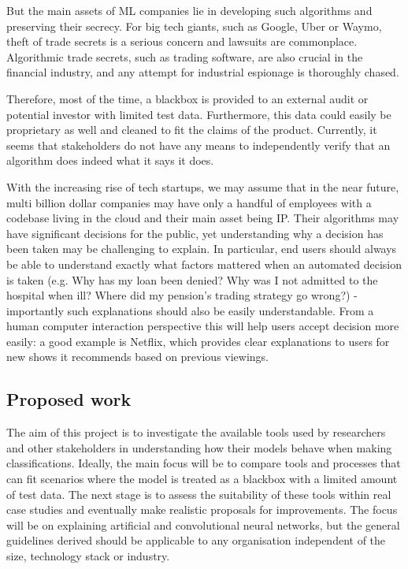\documentclass[proposal]{softeng}
\begin{document}
But the main assets of ML companies lie in developing such algorithms and preserving their secrecy. For big tech giants, such as Google, Uber or Waymo, theft of trade secrets is a serious concern and lawsuits are commonplace\cite{stealuber,waymo}. Algorithmic trade secrets, such as trading software, are also crucial in the financial industry, and any attempt for industrial espionage is thoroughly chased\cite{jeopardy}.

Therefore, most of the time, a blackbox is provided to an external audit or potential investor with limited test data. Furthermore, this data could easily be proprietary as well and cleaned to fit the claims of the product. Currently, it seems that stakeholders do not have any means to independently verify that an algorithm does indeed what it says it does. 

With the increasing rise of tech startups, we may assume that in the near future, multi billion dollar companies may have only a handful of employees with a codebase living in the cloud and their main asset being IP. Their algorithms may have significant decisions for the public, yet understanding why a decision has been taken may be challenging to explain. In particular, end users should always be able to understand exactly what factors mattered when an automated decision is taken (e.g. Why has my loan been denied? Why was I not admitted to the hospital when ill? Where did my pension's trading strategy go wrong?) - importantly such explanations should also be easily understandable. From a human computer interaction perspective this will help users accept decision more easily: a good example is Netflix, which provides clear explanations to users for new shows it recommends based on previous viewings. 

\subsection{Proposed work}

The aim of this project is to investigate the available tools used by researchers and other stakeholders in understanding how their models behave when making classifications. Ideally, the main focus will be to compare tools and processes that can fit scenarios where the model is treated as a blackbox with a limited amount of test data. The next stage is to assess the suitability of these tools within real case studies and eventually make realistic proposals for improvements. The focus will be on explaining artificial and convolutional neural networks, but the general guidelines derived should be applicable to any organisation independent of the size, technology stack or industry.
\end{document}
